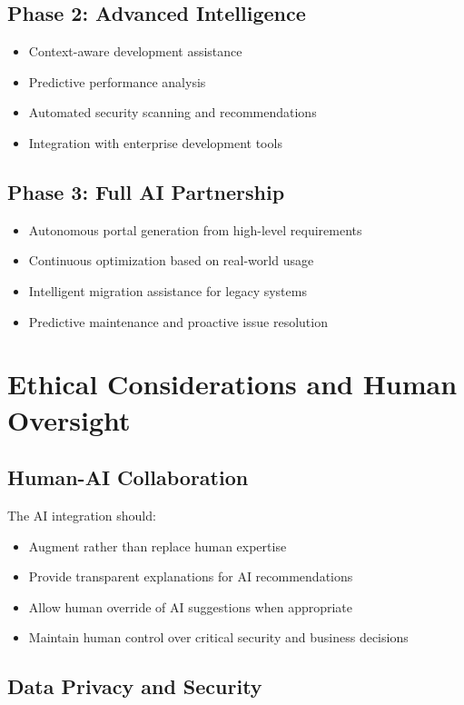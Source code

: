 \subsection{Phase 2: Advanced Intelligence}
\begin{itemize}
\item Context-aware development assistance
\item Predictive performance analysis
\item Automated security scanning and recommendations
\item Integration with enterprise development tools
\end{itemize}

\subsection{Phase 3: Full AI Partnership}
\begin{itemize}
\item Autonomous portal generation from high-level requirements
\item Continuous optimization based on real-world usage
\item Intelligent migration assistance for legacy systems
\item Predictive maintenance and proactive issue resolution
\end{itemize}

\section{Ethical Considerations and Human Oversight}
\label{sec:ethical-considerations}

\subsection{Human-AI Collaboration}

The AI integration should:
\begin{itemize}
\item Augment rather than replace human expertise
\item Provide transparent explanations for AI recommendations
\item Allow human override of AI suggestions when appropriate
\item Maintain human control over critical security and business decisions
\end{itemize}

\subsection{Data Privacy and Security}

